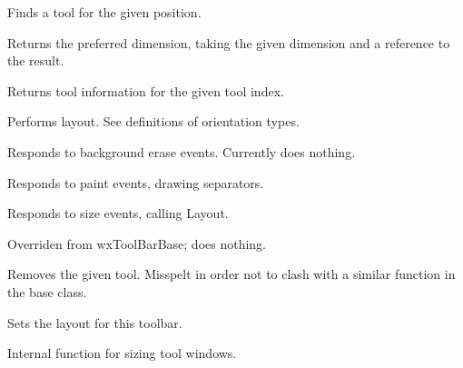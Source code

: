 
Finds a tool for the given position.


\label{wxdynamictoolbargetpreferreddim}


Returns the preferred dimension, taking the given dimension and a reference to the result.


\label{wxdynamictoolbargettoolinfo}


Returns tool information for the given tool index.


\label{wxdynamictoolbarlayout}


Performs layout. See definitions of orientation types.


\label{wxdynamictoolbaronerasebackground}


Responds to background erase events. Currently does nothing.


\label{wxdynamictoolbaronpaint}


Responds to paint events, drawing separators.


\label{wxdynamictoolbaronsize}


Responds to size events, calling Layout.


\label{wxdynamictoolbarrealize}


Overriden from wxToolBarBase; does nothing.


\label{wxdynamictoolbarremvetool}


Removes the given tool. Misspelt in order not to clash with a similar function
in the base class.


\label{wxdynamictoolbarsetlayout}


Sets the layout for this toolbar.


\label{wxdynamictoolbarsizetoolwindows}


Internal function for sizing tool windows.

